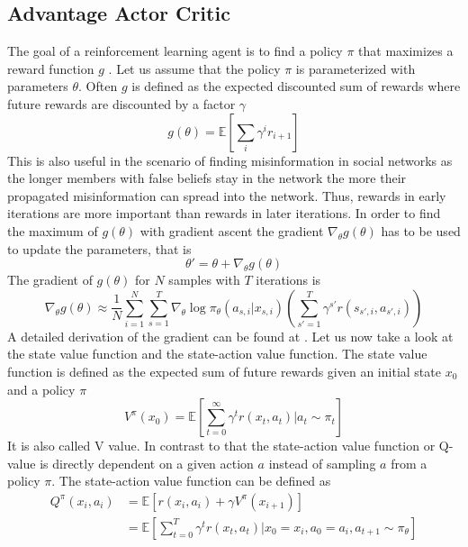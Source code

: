 \documentclass[11pt, a4paper]{article}
\begin{document}
\subsection{Advantage Actor Critic}
The goal of a reinforcement learning agent is to find a policy $\pi$ that maximizes a reward function $g$ \cite{A2C_2}. Let us assume that the policy $\pi$ is parameterized with parameters $\theta$. Often $g$ is defined as the expected discounted sum of rewards where future rewards are discounted by a factor $\gamma$
%
\begin{equation}
	g(\theta) = \mathbb{E}[\sum_{i}^{} \gamma^i r_{i+1}]
\end{equation}
%
This is also useful in the scenario of finding misinformation in social networks as the longer members with false beliefs stay in the network the more their propagated misinformation can spread into the network. Thus, rewards in early iterations are more important than rewards in later iterations.\newline
In order to find the maximum of $g(\theta)$ with gradient ascent the gradient $\nabla_\theta g(\theta)$ has to be used to update the parameters, that is
\begin{equation}
\theta' = \theta + \nabla_\theta g(\theta)
\end{equation}
The gradient of $g(\theta)$ for $N$ samples with $T$ iterations is 
\begin{equation} \label{equ:pol_grad}
	\nabla_\theta g(\theta) \approx \frac{1}{N} \sum_{i=1}^{N}\sum_{s=1}^{T}\nabla_\theta \log \pi_\theta(a_{s,i}|x_{s,i}) \left(\sum_{s'=1}^{T}\gamma^{s'} r(s_{s',i},a_{s',i})\right)
\end{equation}
A detailed derivation of the gradient can be found at \cite{pol_grad2, pol_grad1}. Let us now take a look at the state value function and the state-action value function.
The state value function is defined as the expected sum of future rewards given an initial state $x_0$ and a policy $\pi$
%
\begin{equation}
	V^{\pi}(x_0)=\mathbb{E}[\sum_{t=0}^{\infty}\gamma^tr(x_t,a_t)|a_t\sim\pi_t]
\end{equation}
%
It is also called V value. In contrast to that the state-action value function or Q-value is directly dependent on a given action $a$ instead of sampling $a$ from a policy $\pi$. The state-action value function can be defined as 
%
\begin{equation}
\begin{split}
	Q^\pi(x_i,a_i) 
		& =\mathbb{E}[r(x_i,a_i)+\gamma V^{\pi}(x_{i+1})] \\
		& =\mathbb{E}[\sum_{t=0}^{T} \gamma^t r(x_t,a_t)| x_0=x_i, a_0=a_i, a_{t+1} \sim \pi_{\theta}]
\end{split}
\end{equation}
\end{document}

